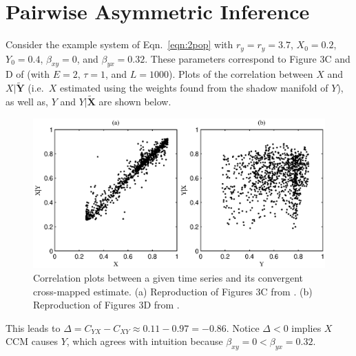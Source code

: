 \documentclass[twocolumn,aps,pre,groupedaddress]{revtex4-1}
\begin{document}
\section{Pairwise Asymmetric Inference}
\label{sec:PAI}

Consider the example system of Eqn.\ \ref{eqn:2pop} with $r_y=r_y=3.7$, $X_0 = 0.2$, $Y_0=0.4$, $\beta_{xy}=0$, and $\beta_{yx}=0.32$.  These parameters correspond to Figure 3C and D of \cite{Sugihara2012} (with $E=2$, $\tau=1$, and $L=1000$).  Plots of the correlation between $X$ and $X|\tilde{\mathbf{Y}}$ (i.e.\ $X$ estimated using the weights found from the shadow manifold of $Y$), as well as, $Y$ and $Y|\tilde{\mathbf{X}}$ are shown below.
\begin{figure}[ht]
\includegraphics[scale=0.5]{SugFig3CD.eps} 
\caption{Correlation plots between a given time series and its convergent cross-mapped estimate.  (a) Reproduction of Figures 3C from \cite{Sugihara2012}. (b) Reproduction of Figures 3D from \cite{Sugihara2012}.}
\label{fig:Sug3CDredo}
\end{figure}
This leads to $\Delta=C_{YX}-C_{XY}\approx 0.11 - 0.97 = -0.86$.  Notice $\Delta<0$ implies $X$ CCM causes $Y$, which agrees with intuition because $\beta_{xy}=0 < \beta_{yx} = 0.32$.
\end{document}
